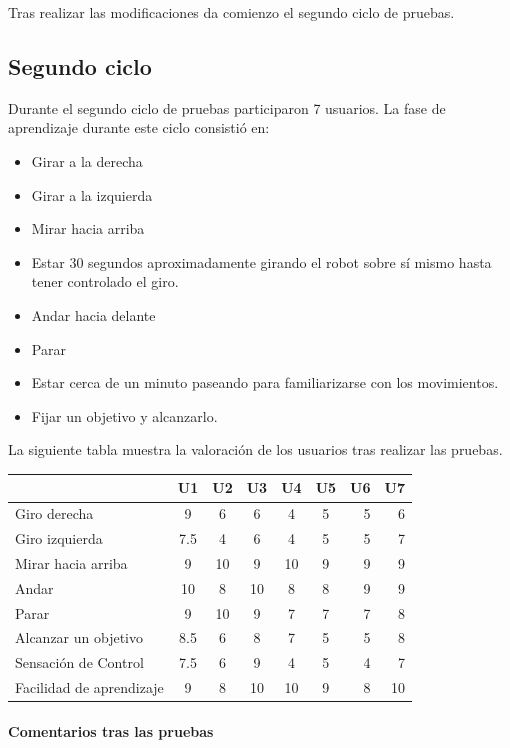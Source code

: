 \documentclass[twoside, 12pt]{epstfg}
\begin{document}
Tras realizar las modificaciones da comienzo el segundo ciclo de pruebas.

\subsection{Segundo ciclo}

Durante el segundo ciclo de pruebas participaron 7 usuarios.
La fase de aprendizaje durante este ciclo consistió en:

\begin{itemize}
	\item Girar a la derecha
	\item Girar a la izquierda
	\item Mirar hacia arriba
	\item Estar 30 segundos aproximadamente girando el robot sobre sí mismo hasta tener controlado el giro.
	\item Andar hacia delante
	\item Parar
	\item Estar cerca de un minuto paseando para familiarizarse con los movimientos.
	\item Fijar un objetivo y alcanzarlo.
\end{itemize}

La siguiente tabla muestra la valoración de los usuarios tras realizar las pruebas.

\begin{tabular}{|l | c | c | c | c | c | r | r |}
	\hline
	& U1 & U2 & U3 & U4 & U5 & U6 & U7\\
	\hline
	Giro derecha & 9 & 6 & 6 & 4 & 5 & 5 & 6\\
	Giro izquierda & 7.5 & 4 & 6 & 4 & 5 & 5 & 7\\
	Mirar hacia arriba & 9 & 10 & 9 & 10 & 9 & 9 & 9\\
	Andar & 10 & 8 & 10 & 8 & 8 & 9 & 9\\
	Parar & 9 & 10 & 9 & 7 & 7 & 7 & 8\\
	Alcanzar un objetivo & 8.5 & 6 & 8 & 7 & 5 & 5 & 8\\
	Sensación de Control & 7.5 & 6 & 9 & 4 & 5 & 4 & 7\\
	Facilidad de aprendizaje & 9 & 8 & 10 & 10 & 9 & 8 & 10\\
	\hline
\end{tabular}


\paragraph{Comentarios tras las pruebas}
\end{document}
